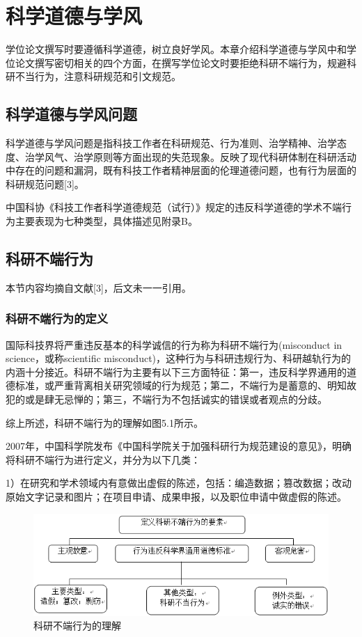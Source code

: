 \chapter{科学道德与学风}

学位论文撰写时要遵循科学道德，树立良好学风。本章介绍科学道德与学风中和学位论文撰写密切相关的四个方面，在撰写学位论文时要拒绝科研不端行为，规避科研不当行为，注意科研规范和引文规范。

\section{科学道德与学风问题}

科学道德与学风问题是指科技工作者在科研规范、行为准则、治学精神、治学态度、治学风气、治学原则等方面出现的失范现象。反映了现代科研体制在科研活动中存在的问题和漏洞，既有科技工作者精神层面的伦理道德问题，也有行为层面的科研规范问题[3]。

中国科协《科技工作者科学道德规范（试行）》规定的违反科学道德的学术不端行为主要表现为七种类型，具体描述见附录B。

\section{科研不端行为}

本节内容均摘自文献[3]，后文未一一引用。

\subsection{科研不端行为的定义}

国际科技界将严重违反基本的科学诚信的行为称为科研不端行为(misconduct in science，或称scientific misconduct)，这种行为与科研违规行为、科研越轨行为的内涵十分接近。科研不端行为主要有以下三方面特征：第一，违反科学界通用的道德标准，或严重背离相关研究领域的行为规范；第二，不端行为是蓄意的、明知故犯的或是肆无忌惮的；第三，不端行为不包括诚实的错误或者观点的分歧。

综上所述，科研不端行为的理解如图5.1所示。

2007年，中国科学院发布《中国科学院关于加强科研行为规范建设的意见》，明确将科研不端行为进行定义，并分为以下几类：

1）在研究和学术领域内有意做出虚假的陈述，包括：编造数据；篡改数据；改动原始文字记录和图片；在项目申请、成果申报，以及职位申请中做虚假的陈述。

\begin{figure} 
	\centering
	\begin{minipage}[t]{1\linewidth} 
		\centering 
		\includegraphics[width=15cm]{chapters/5.1}
		\caption{科研不端行为的理解} 
		\label{fig:5.1} 
	\end{minipage}%
\end{figure}

